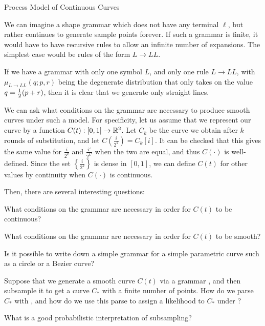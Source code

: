 \newthought
Process Model of Continuous Curves

We can imagine a shape grammar which does not have any terminal
$\ell$, but rather continues to generate sample points forever. If
such a grammar is finite, it would have to have recursive rules to
allow an infinite number of expansions. The simplest case would be
rules of the form $L\to LL$.

If we have a grammar with only one symbol $L$, and only one rule $L\to
LL$, with $\mu_{L\to LL}(q;p,r)$ being the degenerate distribution
that only takes on the value $q=\frac{1}{2}(p+r)$, then it is clear that we
generate only straight lines.

We can ask what conditions on the grammar are necessary to produce
smooth curves under such a model. For specificity, let us assume that
we represent our curve by a function $C(t) : [0,1] \to \mathbb{R}^2$. Let
$C_k$ be the curve we obtain after $k$ rounds of substitution, and let
$C(\frac{i}{2^k}) = C_k[i]$. It can be checked that this gives the
same value for $\frac{i}{2^k}$ and $\frac{i'}{2^{k'}}$ when the two
are equal, and thus $C(\cdot)$ is well-defined.  Since the set
$\left\{\frac{i}{2^k}\right\}$ is dense in $[0,1]$, we can define
$C(t)$ for other values by continuity when $C(\cdot)$ is continuous.

Then, there are several interesting questions:

\begin{q}
What conditions on the grammar are necessary in order for $C(t)$ to
be continuous?
\end{q}

\begin{q}
What conditions on the grammar are necessary in order for $C(t)$ to
be smooth?
\end{q}

\begin{q}
Is it possible to write down a simple grammar for a simple parametric
curve such as a circle or a Bezier curve?
\end{q}

\begin{q}
Suppose that we generate a smooth curve $C(t)$ via a grammar \GGG, and
then subsample it to get a curve $C_*$ with a finite number of
points. How do we parse $C_*$ with \GGG, and how do we use this parse
to assign a likelihood to $C_*$ under \GGG?
\end{q}

\begin{q}
What is a good probabilistic interpretation of subsampling?
\end{q}

